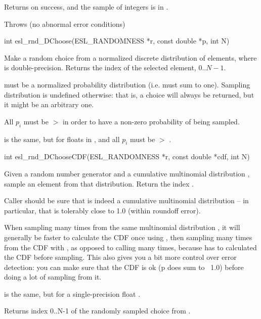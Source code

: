 \begin{sreapi}
Returns  on success, and the sample of  integers
is in .

Throws (no abnormal error conditions)


\hypertarget{func:esl_rnd_DChoose()}
{\item[int esl\_rnd\_DChoose(ESL\_RANDOMNESS *r, const double *p, int N)]}

Make a random choice from a normalized discrete
distribution  of  elements, where 
is double-precision. Returns the index of the
selected element, $0..N-1$.

 must be a normalized probability distribution
(i.e. must sum to one). Sampling distribution is
undefined otherwise: that is, a choice will always
be returned, but it might be an arbitrary one.

All $p_i$ must be $>$  in order to 
have a non-zero probability of being sampled.

 is the same, but for floats in ,
and all $p_i$ must be $>$ .


\hypertarget{func:esl_rnd_DChooseCDF()}
{\item[int esl\_rnd\_DChooseCDF(ESL\_RANDOMNESS *r, const double *cdf, int N)]}

Given a random number generator  and a cumulative
multinomial distribution , sample an element
 from that distribution. Return the index .

Caller should be sure that  is indeed a
cumulative multinomial distribution -- in particular, that
 is tolerably close to 1.0 (within roundoff error).

When sampling many times from the same multinomial
distribution , it will generally be faster to
calculate the CDF once using ,
then sampling many times from the CDF with
, as opposed to calling
 many times, because
 has to calculated the CDF before
sampling. This also gives you a bit more control over
error detection: you can make sure that the CDF is ok (p
does sum to ~1.0) before doing a lot of sampling from
it.

 is the same, but for
a single-precision float .

Returns index 0..N-1 of the randomly sampled choice from .




\end{sreapi}
